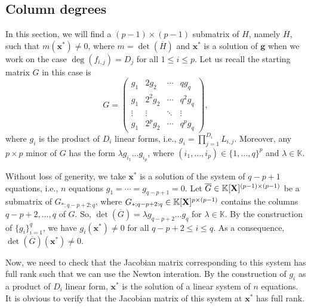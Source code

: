 \documentclass[11pt]{article}
\numberwithin{Property}{section}
\numberwithin{Theorem}{section}
\numberwithin{Proposition}{section}
\numberwithin{Lemma}{section}
\numberwithin{Corollary}{section}
\numberwithin{Definition}{section}
\numberwithin{Remark}{section}
\numberwithin{Conjecture}{section}
\numberwithin{Problem}{section}
\numberwithin{Claim}{section}
\theoremstyle{definition}
\numberwithin{Example}{section}
\def\g {\ensuremath{\mathbf{g}}}
\renewcommand{\leq}{\leqslant}
\def\bar{\overline}
\newcommand{\field}{\mathbb{K}} %
\newcommand{\mat}[1]{\mathbf{\MakeUppercase{#1}}} %
\begin{document}
\subsection{Column degrees}
\label{subsec:cd2}
In this section, we will find a $(p-1)\times (p-1)$ submatrix of $H$, namely $\bar{H}$, such that $m(\mathbf{x}^*) \ne 0$, where $m = \det(\bar{H})$ and $\mathbf{x}^*$ is a solution of $\g$ when we work on the case $\deg(f_{i,j}) = D_j$ for all $1 \leq i \leq p$. Let us recall the starting matrix $G$ in this case is 
\[G = 
\left( \begin{matrix}
g_1 & 2g_2 & \cdots & qg_{q}\\
g_1 & 2^2g_2 & \cdots & q^2g_q\\
\vdots & \vdots & \ddots & \vdots \\
g_1 & 2^pg_2 & \cdots & q^pg_q
\end{matrix} \right),
\]
where $g_{i}$ is the product of $D_i$ linear forms, i.e., $g_i = \prod_{j = 1}^{D_i}L_{i,j}$. Moreover, any $p \times p$ minor of $G$ has the form $\lambda g_{i_1}\ldots g_{i_p}$, where $(i_1, \ldots, i_p) \in \{1, \ldots,q\}^{p}$ and $\lambda \in \field$.

Without loss of generity, we take $\mathbf{x}^*$ is a solution of the system of $q-p+1$ equations, i.e., $n$ equations $g_1 = \cdots = g_{q-p+1} = 0$. Let $\bar{G} \in \field[\mat{X}]^{(p-1) \times (p-1)}$ be a submatrix of $G_{*;q-p+2:q}$, where $G_{*;q-p+2:q} \in \field[\mat{X}]^{p \times (p-1)}$ contains the columns $q-p+2, \ldots, q$ of $G$. So, $\det(\bar{G}) = \lambda g_{q-p+2}\ldots g_{q}$ for $\lambda \in \field$. By the construction of $\{g_i\}_{i=1}^{q}$, we have $g_i(\mathbf{x}^*) \ne 0$ for all $q-p+2 \leq i \leq q$. As a consequence, $\det(\bar{G})(\mathbf{x}^*) \ne 0$. 

Now, we need to check that the Jacobian matrix corresponding to this system has full rank such that we can use the Newton interation. By the construction of $g_{i}$ as a product of $D_i$ linear form, $\mathbf{x}^*$ is the solution of a linear system of $n$ equations. It is obvious to verify that the Jacobian matrix of this system at $\mathbf{x}^*$ has full rank.
\end{document}
